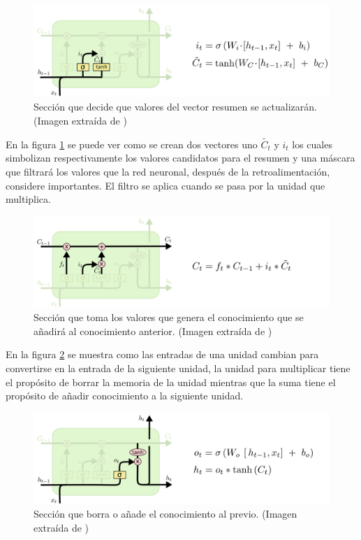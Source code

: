 \begin{figure}[H]
	\centering
	\includegraphics[width=\textwidth]{imagenes/LSTM3-focus-i.png}
	\caption[]{Sección que decide que valores del vector resumen se actualizarán. (Imagen extraída de \cite{christopher_olah_2015})}
	\label{fig:lstmAnadir}
\end{figure}

           
\par En la figura \ref{fig:lstmAnadir} se puede ver como se crean dos vectores uno $\widetilde{C_t}$ y $i_t$ los cuales simbolizan respectivamente los valores candidatos para el resumen y una máscara que filtrará los valores que la red neuronal, después de la retroalimentación, considere importantes. El filtro se aplica cuando se pasa por la unidad que multiplica. 
           
\begin{figure}[H]
	\centering
	\includegraphics[width=\textwidth]{imagenes/LSTM3-focus-C.png}
	\caption[]{Sección que toma los valores que genera el conocimiento que se añadirá al conocimiento anterior. (Imagen extraída de \cite{christopher_olah_2015})}
	\label{fig:lstmSuma}
\end{figure}
           
\par En la figura \ref{fig:lstmSuma} se muestra como las entradas de una unidad cambian para convertirse en la entrada de la siguiente unidad, la unidad para multiplicar tiene el propósito de borrar la memoria de la unidad mientras que la suma tiene el propósito de añadir conocimiento a la siguiente unidad.
           
\begin{figure}[H]
	\centering
	\includegraphics[width=\textwidth]{imagenes/LSTM3-focus-o.png}
	\caption[]{Sección que borra o añade el conocimiento al previo. (Imagen extraída de \cite{christopher_olah_2015})}
	\label{fig:lstmFinal}
\end{figure}
           
